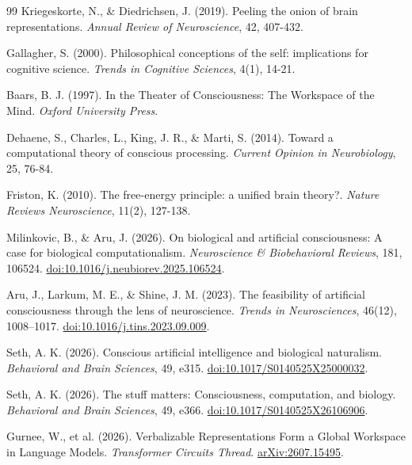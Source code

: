\begin{thebibliography}{99}
 Kriegeskorte, N., \& Diedrichsen, J. (2019). Peeling the onion of brain representations. \textit{Annual Review of Neuroscience}, 42, 407-432.

 Gallagher, S. (2000). Philosophical conceptions of the self: implications for cognitive science. \textit{Trends in Cognitive Sciences}, 4(1), 14-21.

 Baars, B. J. (1997). In the Theater of Consciousness: The Workspace of the Mind. \textit{Oxford University Press}.

 Dehaene, S., Charles, L., King, J. R., \& Marti, S. (2014). Toward a computational theory of conscious processing. \textit{Current Opinion in Neurobiology}, 25, 76-84.

 Friston, K. (2010). The free-energy principle: a unified brain theory?. \textit{Nature Reviews Neuroscience}, 11(2), 127-138.

 Milinkovic, B., \& Aru, J. (2026). On biological and artificial consciousness: A case for biological computationalism. \textit{Neuroscience \& Biobehavioral Reviews}, 181, 106524. \href{https://doi.org/10.1016/j.neubiorev.2025.106524}{doi:10.1016/j.neubiorev.2025.106524}.

 Aru, J., Larkum, M. E., \& Shine, J. M. (2023). The feasibility of artificial consciousness through the lens of neuroscience. \textit{Trends in Neurosciences}, 46(12), 1008--1017. \href{https://doi.org/10.1016/j.tins.2023.09.009}{doi:10.1016/j.tins.2023.09.009}.

 Seth, A. K. (2026). Conscious artificial intelligence and biological naturalism. \textit{Behavioral and Brain Sciences}, 49, e315. \href{https://doi.org/10.1017/S0140525X25000032}{doi:10.1017/S0140525X25000032}.

 Seth, A. K. (2026). The stuff matters: Consciousness, computation, and biology. \textit{Behavioral and Brain Sciences}, 49, e366. \href{https://doi.org/10.1017/S0140525X26106906}{doi:10.1017/S0140525X26106906}.

 Gurnee, W., et al. (2026). Verbalizable Representations Form a Global Workspace in Language Models. \textit{Transformer Circuits Thread}. \href{https://arxiv.org/abs/2607.15495}{arXiv:2607.15495}.


\end{thebibliography}
